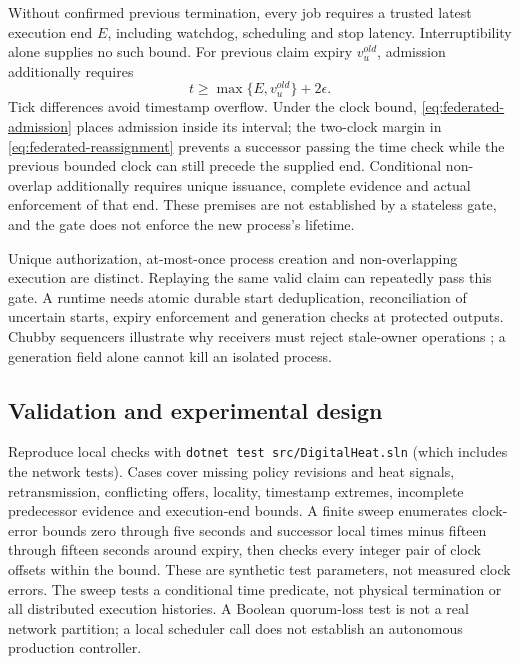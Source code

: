 Without confirmed previous termination, every job requires a trusted latest execution end $E$,
including watchdog, scheduling and stop latency. Interruptibility alone supplies no such bound.
For previous claim expiry $v_u^{old}$, admission additionally requires
\begin{equation}
 t\ge\max\{E,v_u^{old}\}+2\epsilon. \label{eq:federated-reassignment}
\end{equation}
Tick differences avoid timestamp overflow. Under the clock bound,
\eqref{eq:federated-admission} places admission inside its interval; the two-clock margin in
\eqref{eq:federated-reassignment} prevents a successor passing the time check while the previous
bounded clock can still precede the supplied end. Conditional non-overlap additionally requires
unique issuance, complete evidence and actual enforcement of that end. These premises are not
established by a stateless gate, and the gate does not enforce the new process's lifetime.

Unique authorization, at-most-once process creation and non-overlapping execution are distinct.
Replaying the same valid claim can repeatedly pass this gate. A runtime needs atomic durable start
deduplication, reconciliation of uncertain starts, expiry enforcement and generation checks at
protected outputs. Chubby sequencers illustrate why receivers must reject stale-owner operations
\cite{burrows2006chubby}; a generation field alone cannot kill an isolated process.

\subsection{Validation and experimental design}
Reproduce local checks with
\texttt{dotnet test src/DigitalHeat.sln} (which includes the network tests).
Cases cover missing policy revisions and heat signals, retransmission, conflicting offers,
locality, timestamp extremes, incomplete predecessor evidence and execution-end bounds. A finite
sweep enumerates clock-error bounds zero through five seconds and successor local times minus
fifteen through fifteen seconds around expiry, then checks every integer pair of clock offsets
within the bound. These are synthetic test parameters, not measured clock errors. The sweep tests
a conditional time predicate, not physical termination or all distributed execution histories.
A Boolean quorum-loss test is not a real network partition; a local scheduler call does not
establish an autonomous production controller.

